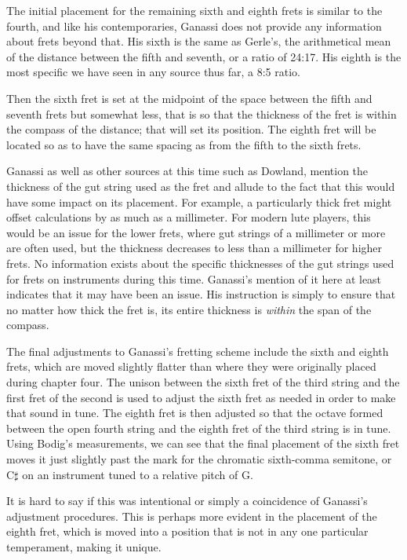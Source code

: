 The initial placement for the remaining sixth and eighth frets is similar to the
fourth, and like his contemporaries, Ganassi does not provide any information
about frets beyond that. His sixth is the same as Gerle's, the arithmetical
mean of the distance between the fifth and seventh, or a ratio of 24:17. His
eighth is the most specific we have seen in any source thus far, a 8:5 ratio.
\begin{blocks}
Then the sixth fret is set at the midpoint of the space between the fifth and seventh
frets but somewhat less, that is so that the thickness of the fret is within the
compass of the distance; that will set its position. The eighth fret will be located
so as to have the same spacing as from the fifth to the sixth frets.
\end{blocks}
Ganassi as well as other sources at this time such as Dowland, mention the thickness
of the gut string used as the fret and allude to the fact that this would have
some impact on its placement. For example, a particularly thick fret might offset
calculations by as much as a millimeter. For modern lute players, this would be an
issue for the lower frets, where gut strings of a millimeter or more are often used, but
the thickness decreases to less than a millimeter for higher frets. No
information exists about the specific thicknesses of the gut strings used for frets on
instruments during this time. Ganassi's mention of it here at least indicates that it
may have been an issue. His instruction is simply to ensure that no matter how thick
the fret is, its entire thickness is \textit{within} the span of the compass.

The final adjustments to Ganassi's fretting scheme include the sixth and eighth frets,
which are moved slightly flatter than where they were originally placed during chapter
four. The unison between the sixth fret of the third string and the first fret of the
second is used to adjust the sixth fret as needed in order to make that sound in tune. The
eighth fret is then adjusted so that the octave formed between the open fourth string
and the eighth fret of the third string is in tune. Using Bodig's measurements, we can
see that the final placement of the sixth fret moves it just slightly past the mark for
the chromatic sixth-comma semitone, or C$\sharp$ on an instrument tuned to a relative
pitch of G.

It is hard to say if this was intentional or simply a coincidence of Ganassi's
adjustment procedures. This is perhaps more evident in the placement of the
eighth fret, which is moved into a position that is not in any one particular
temperament, making it unique.


